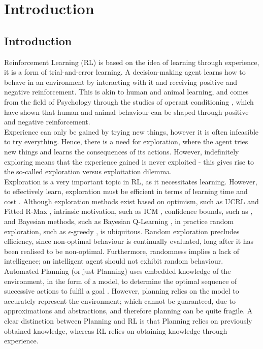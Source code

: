 
\chapter{Introduction}

\label{chapter1}
\section{Introduction}

Reinforcement Learning (RL) \cite{DBLP:books/lib/SuttonB98} is based on the idea of learning through experience, it is a form of trial-and-error learning. A decision-making agent learns how to behave in an environment by interacting with it and receiving positive and negative reinforcement. This is akin to human and animal learning, and comes from the field of Psychology through the studies of operant conditioning \cite{nla.cat-vn2770732}, which have shown that human and animal behaviour can be shaped through positive and negative reinforcement.
\\Experience can only be gained by trying new things, however it is often infeasible to try everything. Hence, there is a need for exploration, where the agent tries new things and learns the consequences of its actions. However, indefinitely exploring means that the experience gained is never exploited - this gives rise to the so-called exploration versus exploitation dilemma. 
\\Exploration is a very important topic in RL, as it necessitates learning. However, to effectively learn, exploration must be efficient in terms of learning time and cost \cite{Thrun-1992-15850}. Although exploration methods exist based on optimism, such as UCRL \cite{NIPS2006_c1b70d96} and Fitted R-Max \cite{SARA07-jong}, intrinsic motivation, such as ICM \cite{DBLP:journals/corr/PathakAED17}, confidence bounds, such as \cite{10.5555/911176}, and Bayesian methods, such as Bayesian Q-Learning \cite{10.5555/944919.944941}, in practice random exploration, such as $\epsilon$-greedy \cite{Watkins:1989, conf/nips/Sutton95}, is ubiquitous. Random exploration precludes efficiency, since non-optimal behaviour is continually evaluated, long after it has been realised to be non-optimal. Furthermore, randomness implies a lack of intelligence; an intelligent agent should not exhibit random behaviour.
\\Automated Planning (or just Planning) \cite{russelNorvig2003:aima, Lav06} uses embedded knowledge of the environment, in the form of a model, to determine the optimal sequence of successive actions to fulfil a goal . However, planning relies on the model to accurately represent the environment; which cannot be guaranteed, due to approximations and abstractions, and therefore planning can be quite fragile. A clear distinction between Planning and RL is that Planning relies on previously obtained knowledge, whereas RL relies on obtaining knowledge through experience.
